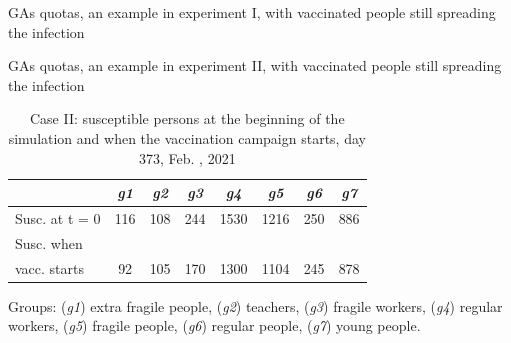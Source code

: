 \documentclass[8pt]{beamer}
\begin{document}
\begin{frame}{GAs quotas, an example in experiment I, with vaccinated people still spreading the infection}
\end{frame}

\begin{frame}{GAs quotas, an example in experiment II, with vaccinated people still spreading the infection}

\medskip

\begin{table}[H]
\centering
\begin{small} %
\begin{tabular}{lccccccc}
\toprule
& \emph{g1} & \emph{g2} & \emph{g3} & \emph{g4} & \emph{g5} & \emph{g6} & \emph{g7} \\
\midrule
Susc. at t = 0 &116 & 108 & 244 & 1530 & 1216 & 250 & 886 \\
Susc. when\\vacc. starts & 92 & 105 & 170 & 1300 & 1104 & 245 & 878 \\
\bottomrule  
\end{tabular}
\end{small}
\caption{Case II: susceptible persons at the beginning of the simulation and when the vaccination campaign starts,  day 373, Feb. , 2021}
\label{susceptibleCaseForGA_I}
\end{table}
Groups: (\emph{g1}) extra fragile people, (\emph{g2}) teachers, (\emph{g3}) fragile workers, (\emph{g4}) regular workers, (\emph{g5}) fragile people, (\emph{g6}) regular people, (\emph{g7}) young people.

\medskip


\end{frame}
\end{document}
